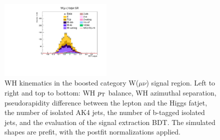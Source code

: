 \begin{figure}[tbp]
\begin{center}
    \includegraphics[width=0.48\textwidth]{figures/wlnhbb2016/boosted/WmnWHFJSR_bdtValue.pdf}
    \caption{WH kinematics in the boosted category W($\mu\nu$) signal region.
    Left to right and top to bottom: WH $p_{\mathrm{T}}$ balance, WH azimuthal separation,
    pseudorapidity difference between the lepton and the Higgs fatjet,
    the number of isolated AK4 jets, the number of b-tagged isolated jets,
    and the evaluation of the signal extraction BDT.
    The simulated shapes are prefit, with the postfit normalizations applied.}
    \label{fig:boost_WmnSR_WH}
  \end{center}
\end{figure}
\clearpage

